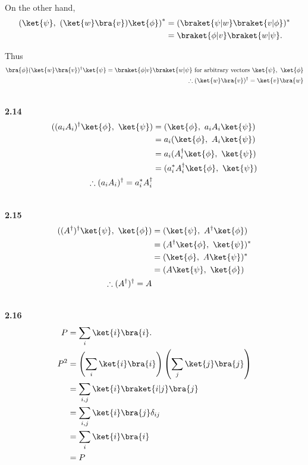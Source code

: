 \documentclass[10pt]{book}
\newcommand{\Textbf}[1]{\hspace{3mm}\\ \textbf{#1}\\}
\begin{document}
	On the other hand,
	\begin{equation}
\begin{aligned}
		\left(\ket{\psi},\ (\ket{w}\bra{v}) \ket{\phi}\right)^*
		&= (\braket{\psi | w} \braket{v | \phi})^*\\
		&= \braket{\phi | v} \braket{w | \psi}.
	\end{aligned}
\end{equation}
	
	Thus
	\begin{equation}
\begin{aligned}
		\bra{\phi} (\ket{w}\bra{v})^\dagger \ket{\psi} = \braket{\phi | v} \braket{w | \psi} \text{ for arbitrary vectors } \ket{\psi},\ \ket{\phi}\\
		\therefore (\ket{w}\bra{v})^\dagger = \ket{v}\bra{w}
	\end{aligned}
\end{equation}
	
	
	\Textbf{2.14}
	\begin{equation}
\begin{aligned}
		( (a_i A_i)^\dagger \ket{\phi},\ \ket{\psi} )
		&= (\ket{\phi},\ a_i A_i \ket{\psi})\\
		&= a_i (\ket{\phi},\ A_i \ket{\psi})\\
		&= a_i (A_i^\dagger \ket{\phi},\ \ket{\psi})\\
		&= (a_i^* A_i^\dagger \ket{\phi},\ \ket{\psi})\\
		\therefore (a_i A_i)^\dagger = a_i^* A_i^\dagger
	\end{aligned}
\end{equation}
	
	
	
	
	\Textbf{2.15}
	\begin{equation}
\begin{aligned}
		((A^\dagger)^\dagger\ket{\psi},\ \ket{\phi} )
		&= (\ket{\psi},\ A^\dagger \ket{\phi})\\
		&= (A^\dagger \ket{\phi},\ \ket{\psi})^*\\
		&= (\ket{\phi},\ A\ket{\psi})^*\\
		&= (A\ket{\psi},\ \ket{\phi})\\
		\therefore (A^\dagger)^\dagger = A
	\end{aligned}
\end{equation}
	
	
	\Textbf{2.16}
	\begin{equation}
\begin{aligned}
		P &= \sum_i \ket{i}\bra{i}.\\
		P^2 &= \left(\sum_i \ket{i}\bra{i}\right) \left(\sum_j \ket{j}\bra{j}\right)\\
		&= \sum_{i,j} \ket{i}\braket{i | j}\bra{j}\\
		&= \sum_{i,j} \ket{i}\bra{j} \delta_{ij}\\
		&= \sum_i \ket{i}\bra{i}\\
		&= P
	\end{aligned}
\end{equation}
	
\end{document}
